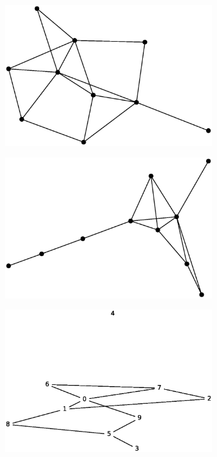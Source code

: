 \begin{figure}[h!]
     \centering
     \begin{subfigure}[b]{0.29\textwidth}
         \includegraphics[width=\columnwidth]{images/gnpes2.eps}
     \end{subfigure}
     \hspace{0.8em}
     \begin{subfigure}[b]{0.29\textwidth}
         \includegraphics[width=\columnwidth]{images/gnpes1.eps}
     \end{subfigure}
     \hspace{0.8em}
     \begin{subfigure}[b]{0.29\textwidth}
         \includegraphics[width=\columnwidth]{images/gnpes0.eps}

\end{subfigure}
\end{figure}
